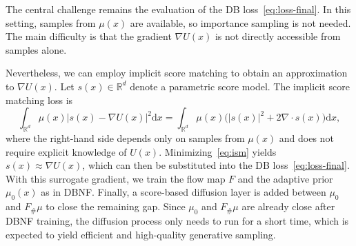 \documentclass{article}
\newcommand{\D}{\mathrm{d}}
\theoremstyle{plain}
\begin{document}
The central challenge remains the evaluation of the DB loss~\eqref{eq:loss-final}. In this setting, samples from $\mu(x)$ are available, so importance sampling is not needed. The main difficulty is that the gradient $\nabla U(x)$ is not directly accessible from samples alone.

Nevertheless, we can employ implicit score matching to obtain an approximation to $\nabla U(x)$. Let $s(x) \in \mathbb R^d$ denote a parametric score model. The implicit score matching loss is
\begin{equation}\label{eq:ism}
    \int_{\mathbb R^d} \mu(x)  |s(x) - \nabla U(x)|^2 \D x =
    \int_{\mathbb R^d} \mu(x) \big(|s(x)|^2 + 2\nabla\cdot s(x)\big)\D x,
\end{equation}
where the right-hand side depends only on samples from $\mu(x)$ and does not require explicit knowledge of $U(x)$. Minimizing~\eqref{eq:ism} yields $s(x) \approx \nabla U(x)$, which can then be substituted into the DB loss~\eqref{eq:loss-final}. With this surrogate gradient, we train the flow map $F$ and the adaptive prior $\mu_0(x)$ as in DBNF. Finally, a score-based diffusion layer is added between $\mu_0$ and $F_{\#}\mu$ to close the remaining gap. Since $\mu_0$ and $F_{\#}\mu$ are already close after DBNF training, the diffusion process only needs to run for a short time, which is expected to yield efficient and high-quality generative sampling.
\end{document}
